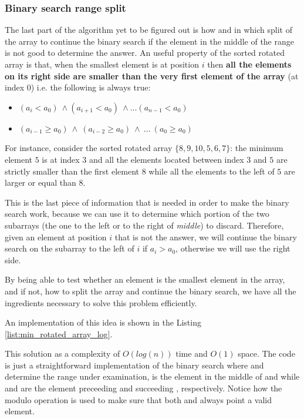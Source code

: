 \subsubsection{Binary search range split}

The last part of the algorithm yet to be figured out is how and in which split of the array to continue the binary search if the element in the middle of the range is not good to determine the answer. An useful property of the sorted rotated array is that, when the smallest element is at position $i$ then \textbf{all the elements on its right side are smaller than the very first element of the array} (at index $0$) i.e. the following is always true:

\begin{itemize}
	\item $	(a_i < a_0) \: \wedge (a_{i+1} < a_0) \: \wedge \ldots (a_{n-1} < a_0) $
	\item $	(a_{i-1} \geq a_0) \: \wedge \: (a_{i-2} \geq a_0) \: \wedge \: \ldots \: (a_{0} \geq a_0) $
\end{itemize}
For instance, consider the sorted rotated array $\{8,9,10,5,6,7\}$: the minimum element $5$ is at index $3$ and all the elements located between index $3$ and $5$ are strictly smaller than the first element $8$ while all the elements to the left of $5$ are larger or equal than $8$.

This is the last piece of information that is needed in order to make the binary search work, because we can use it to determine which portion of the two subarrays (the one to the left or to the right of \textit{middle}) to discard. Therefore, given an element at position $i$ that is not the answer, we will continue the binary search on the subarray to the left of $i$ if $a_i > a_0$, otherwise we will use the right side.

By being able to test whether an element is the smallest element in the array, and if not, how to split the array and continue the binary search, we have all the ingredients necessary to solve this problem efficiently.

An implementation of this idea is shown in the Listing \ref{list:min_rotated_array_log}.



This solution as a complexity of $O(log(n))$ time and $O(1)$ space.
The code is just a straightforward implementation of the binary search where  and  determine the range under examination,  is the element in the middle of  and  while  and  are the element preceeding and succeeding , respectively. Notice how the modulo operation is used to make sure that both  and  always point a valid element. 
